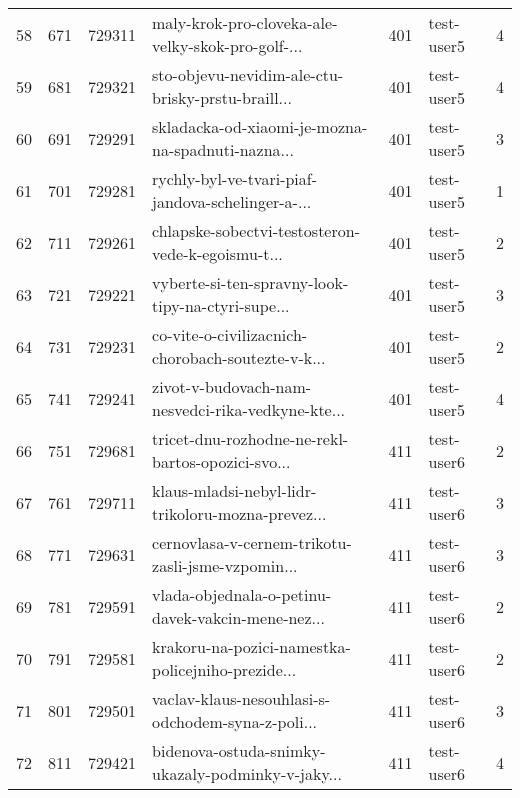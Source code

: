 \begin{tabular}{lrrlrlr}
58   &        671 &   729311 &  maly-krok-pro-cloveka-ale-velky-skok-pro-golf-... &      401 &                   test-user5 &               4 \\
59   &        681 &   729321 &  sto-objevu-nevidim-ale-ctu-brisky-prstu-braill... &      401 &                   test-user5 &               4 \\
60   &        691 &   729291 &  skladacka-od-xiaomi-je-mozna-na-spadnuti-nazna... &      401 &                   test-user5 &               3 \\
61   &        701 &   729281 &  rychly-byl-ve-tvari-piaf-jandova-schelinger-a-... &      401 &                   test-user5 &               1 \\
62   &        711 &   729261 &  chlapske-sobectvi-testosteron-vede-k-egoismu-t... &      401 &                   test-user5 &               2 \\
63   &        721 &   729221 &  vyberte-si-ten-spravny-look-tipy-na-ctyri-supe... &      401 &                   test-user5 &               3 \\
64   &        731 &   729231 &  co-vite-o-civilizacnich-chorobach-soutezte-v-k... &      401 &                   test-user5 &               2 \\
65   &        741 &   729241 &  zivot-v-budovach-nam-nesvedci-rika-vedkyne-kte... &      401 &                   test-user5 &               4 \\
66   &        751 &   729681 &  tricet-dnu-rozhodne-ne-rekl-bartos-opozici-svo... &      411 &                   test-user6 &               2 \\
67   &        761 &   729711 &  klaus-mladsi-nebyl-lidr-trikoloru-mozna-prevez... &      411 &                   test-user6 &               3 \\
68   &        771 &   729631 &  cernovlasa-v-cernem-trikotu-zasli-jsme-vzpomin... &      411 &                   test-user6 &               3 \\
69   &        781 &   729591 &  vlada-objednala-o-petinu-davek-vakcin-mene-nez... &      411 &                   test-user6 &               2 \\
70   &        791 &   729581 &  krakoru-na-pozici-namestka-policejniho-prezide... &      411 &                   test-user6 &               2 \\
71   &        801 &   729501 &  vaclav-klaus-nesouhlasi-s-odchodem-syna-z-poli... &      411 &                   test-user6 &               3 \\
72   &        811 &   729421 &  bidenova-ostuda-snimky-ukazaly-podminky-v-jaky... &      411 &                   test-user6 &               4 \\

\end{tabular}
